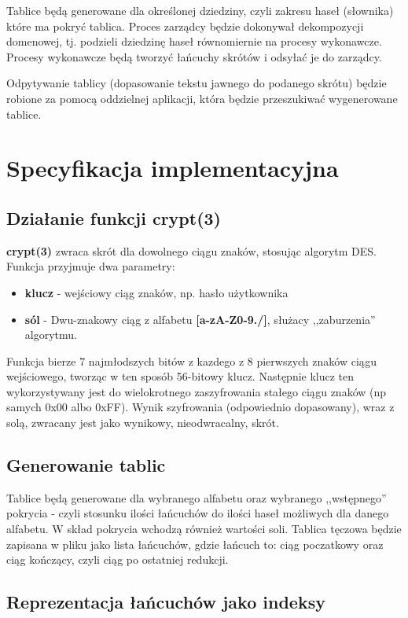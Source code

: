 \documentclass[a4paper,11pt]{article}
\begin{document}
Tablice będą generowane dla określonej dziedziny, czyli zakresu haseł (słownika) które ma pokryć tablica. Proces zarządcy będzie dokonywał dekompozycji domenowej, tj. podzieli dziedzinę haseł równomiernie na procesy wykonawcze. Procesy wykonawcze będą tworzyć łańcuchy skrótów i odsyłać je do zarządcy.

Odpytywanie tablicy (dopasowanie tekstu jawnego do podanego skrótu) będzie robione za pomocą oddzielnej aplikacji, która będzie przeszukiwać wygenerowane tablice.

\section{Specyfikacja implementacyjna}

\subsection{Działanie funkcji crypt(3)}

\textbf{crypt(3)} zwraca skrót dla dowolnego ciągu znaków, stosując algorytm DES. Funkcja przyjmuje dwa parametry:
\begin{itemize}
	\item \textbf{klucz} - wejściowy ciąg znaków, np. hasło użytkownika
	\item \textbf{sól} - Dwu-znakowy ciąg z alfabetu \textbf{[a-zA-Z0-9./]}, służacy ,,zaburzenia'' algorytmu.
\end{itemize}

Funkcja bierze 7 najmłodszych bitów z kazdego z 8 pierwszych znaków ciągu wejściowego, tworząc w ten sposób 56-bitowy klucz. Następnie klucz ten wykorzystywany jest do wielokrotnego zaszyfrowania stałego ciągu znaków (np samych 0x00 albo 0xFF). Wynik szyfrowania (odpowiednio dopasowany), wraz z solą, zwracany jest jako wynikowy, nieodwracalny, skrót.

\subsection{Generowanie tablic}

Tablice będą generowane dla wybranego alfabetu oraz wybranego ,,wstępnego'' pokrycia - czyli stosunku ilości łańcuchów do ilości haseł możliwych dla danego alfabetu. W skład pokrycia wchodzą również wartości soli. Tablica tęczowa będzie zapisana w pliku jako lista łańcuchów, gdzie łańcuch to: ciąg poczatkowy oraz ciąg kończący, czyli ciąg po ostatniej redukcji.

\subsection{Reprezentacja łańcuchów jako indeksy}
\end{document}
